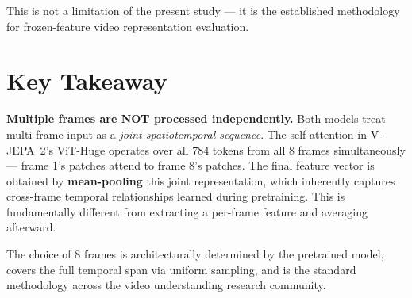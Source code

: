 \documentclass[a4paper, 12pt]{article}
\begin{document}
This is not a limitation of the present study --- it is the established methodology for frozen-feature video representation evaluation.

\section{Key Takeaway}

\textbf{Multiple frames are NOT processed independently.} Both models treat multi-frame input as a \emph{joint spatiotemporal sequence}. The self-attention in V-JEPA~2's ViT-Huge operates over all 784 tokens from all 8 frames simultaneously --- frame 1's patches attend to frame 8's patches. The final feature vector is obtained by \textbf{mean-pooling} this joint representation, which inherently captures cross-frame temporal relationships learned during pretraining. This is fundamentally different from extracting a per-frame feature and averaging afterward.

The choice of 8 frames is architecturally determined by the pretrained model, covers the full temporal span via uniform sampling, and is the standard methodology across the video understanding research community.
\end{document}
